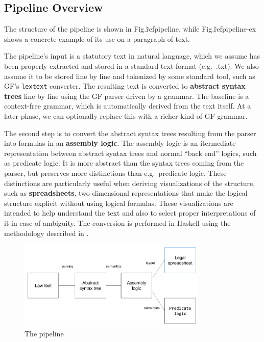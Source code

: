 \documentclass{IOS-Book-Article}
\begin{document}
\subsection{Pipeline Overview}

The structure of the pipeline is shown in Fig.\~ref{pipeline}, while Fig.\~ref{pipeline-ex} shows a concrete example of its use on a paragraph of text.

The pipeline's input is a statutory text in natural language, which we assume has been properly extracted and stored in a standard text format (e.g.\ .txt).
We also assume it to be stored line by line and tokenized by some standard tool, such as GF's \texttt{lextext} converter. 
The resulting text is converted to \textbf{abstract syntax trees} line by line using the GF parser driven by a  grammar.
The baseline is a context-free grammar, which is automatically derived from the text itself.
At a later phase, we can optionally replace this with a richer kind of GF grammar.

The second step is to convert the abstract syntax trees resulting from the parser into formulas in an \textbf{assembly logic}.
The assembly logic is an itermediate representation between abstract syntax trees and normal ``back end'' logics, such as predicate logic.
It is more abstract than the syntax trees coming from the parser, but preserves more distinctions than e.g.\ predicate logic.
These distinctions are particularly useful when deriving visualizations of the structure, such as \textbf{spreadsheets}, two-dimensional representations that make the logical structure explicit without using logical formulas.
These visualizations are intended to help understand the text and also to select proper interpretations of it in case of ambiguity.
The conversion is performed in Haskell using the methodology described in \cite{ranta-2011c}.

\begin{figure}
    \includegraphics[width=0.8\textwidth]{pipeline.png}
\caption{The pipeline}
\label{pipeline}
\end{figure}
\end{document}
